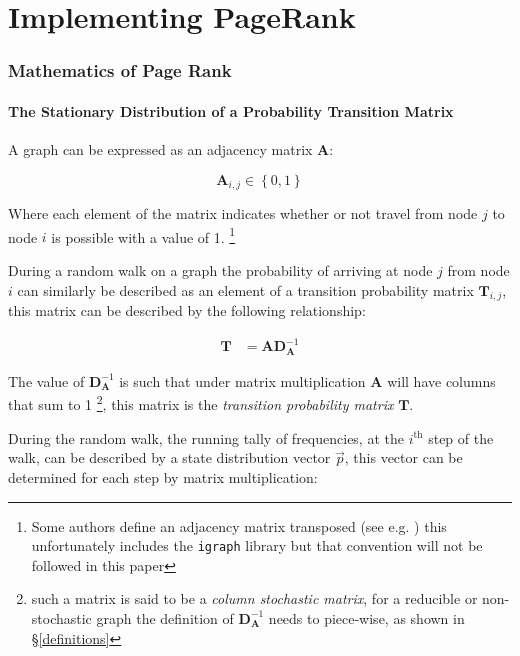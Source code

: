 \documentclass[11pt, twoside]{report}
\begin{document}
\part{Implementing PageRank}
\section{Mathematics of Page Rank}
\label{PageRank-Generally}
\cite[\S 1.1.7]{chingMarkovChainsModels2006}
\subsection{The Stationary Distribution of a Probability Transition Matrix}
\label{stationary-distribution-of-t}
A graph can be expressed as an adjacency matrix \(\mathbf{A}\):

\[
\mathbf{A}_{i,j} \in \left\{ 0,1 \right\}
\]

Where each element of the matrix indicates whether or not travel from
node \(j\) to node \(i\) is possible with a value of 1. \footnote{Some
authors define an adjacency matrix transposed (see e.g.
\cite{rosenDiscreteMathematicsIts2007,meghabghabSearchEnginesLink2008})
this unfortunately includes the \texttt{igraph} library
\cite{gaborcsardiIgraphManualPages2019} but that convention will not be
followed in this paper}

During a random walk on a graph the probability of arriving at node \(j\) from node
\(i\) can similarly be described as an element of a transition probability
matrix \(\mathbf{T}_{i,j}\), this matrix can be described by the following
relationship:

\begin{align}
\mathbf{T} &= \mathbf{A} \mathbf{D}^{-1}_{\mathbf{A}} \label{eq:basic-trans-def}
\end{align}

The value of \(\mathbf{D}^{-1}_{\mathbf{A}}\) is such that under matrix
multiplication \(\mathbf{A}\) will have columns that sum to 1 \footnote{such a matrix is said to be a \emph{column stochastic
matrix}, for a
reducible or non-stochastic graph the definition of
\(\mathbf{D}^{-1}_{\mathbf{A}}\) needs to piece-wise, as shown in \S \ref{definitions}}, this matrix is the \emph{transition probability
matrix} \(\mathbf{T}\).

During the random walk, the running tally of frequencies, at the
\(i^{\mathrm{th}}\) step of the walk, can be described by a state distribution
vector \(\vec{p}\), this vector can be determined for each step by matrix
multiplication:
\end{document}
